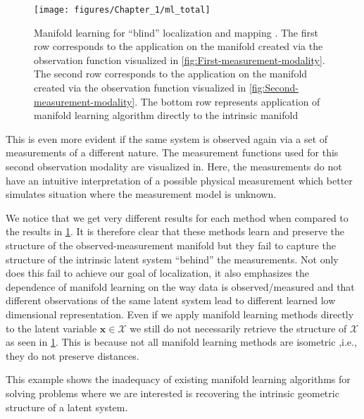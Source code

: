 	\begin{figure}[h]
		\centering{}%
		\begin{minipage}[t]{1\columnwidth}%
			\begin{center}
				\texttt{[image: figures/Chapter\_1/ml\_total]}
				\par\end{center}%
		\end{minipage}\caption{Manifold learning for ``blind'' localization and mapping \label{fig:Application-of-manifold}. The first row corresponds to the application on the manifold created via the observation function visualized in \cref{fig:First-measurement-modality}. The second row corresponds to the application on the manifold created via the observation function visualized in \cref{fig:Second-measurement-modality}. The bottom row represents application of manifold learning algorithm directly to the intrinsic manifold}
	\end{figure}

	This is even more evident if the same system is observed again via a set of measurements of a different nature. The measurement functions used for this second observation modality are visualized in. Here, the measurements do not have an intuitive interpretation of a possible physical measurement which better simulates situation where the measurement model is unknown.
		
		
	We notice that we get very different results for each method when compared to the results in \cref{fig:Application-of-manifold}. It is therefore clear that these methods learn and preserve the structure of the observed-measurement manifold but they fail to capture the structure of the intrinsic latent system “behind” the measurements. Not only does this fail to achieve our goal of localization, it also emphasizes the dependence of manifold learning on the way data is observed/measured and that different observations of the same latent system lead to different learned low dimensional representation. Even if we apply manifold learning methods directly to the latent variable $\mathbf{x}\in\mathcal{X}$ we still do not necessarily retrieve the structure of $\mathcal{X}$ as seen in \cref{fig:Application-of-manifold}. This is because not all manifold learning methods are isometric ,i.e., they do not preserve distances.	
		
	This example shows the inadequacy of existing manifold learning algorithms for solving problems where we are interested is recovering the intrinsic geometric structure of a latent system. 
	
